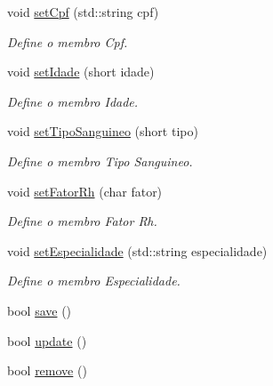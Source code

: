\begin{DoxyCompactItemize}
void \hyperlink{classFuncionario_a4fd103578189cdce84cd0f76f6c668fd}{set\+Cpf} (std\+::string cpf)
\begin{DoxyCompactList}\small\item\em Define o membro Cpf. \end{DoxyCompactList}\item 
void \hyperlink{classFuncionario_af85eeb2e2b606d60da800c7084f23769}{set\+Idade} (short idade)
\begin{DoxyCompactList}\small\item\em Define o membro Idade. \end{DoxyCompactList}\item 
void \hyperlink{classFuncionario_a3e690d80c156f121598a28fb41de7aa1}{set\+Tipo\+Sanguineo} (short tipo)
\begin{DoxyCompactList}\small\item\em Define o membro Tipo Sanguineo. \end{DoxyCompactList}\item 
void \hyperlink{classFuncionario_aa8a9bab437eb41578fe514f26c16e5d2}{set\+Fator\+Rh} (char fator)
\begin{DoxyCompactList}\small\item\em Define o membro Fator Rh. \end{DoxyCompactList}\item 
void \hyperlink{classFuncionario_ae412312aaaaceaca6dd132e8397b283f}{set\+Especialidade} (std\+::string especialidade)
\begin{DoxyCompactList}\small\item\em Define o membro Especialidade. \end{DoxyCompactList}\item 
bool \hyperlink{classFuncionario_acb246ecc22f9135f2adad51a131ea45c}{save} ()
\item 
bool \hyperlink{classFuncionario_a72916b5b2b096630ebc93e4301ee7437}{update} ()
\item 
bool \hyperlink{classFuncionario_a0ea198bfb72865e5e0bf913c62020275}{remove} ()
\end{DoxyCompactItemize}

